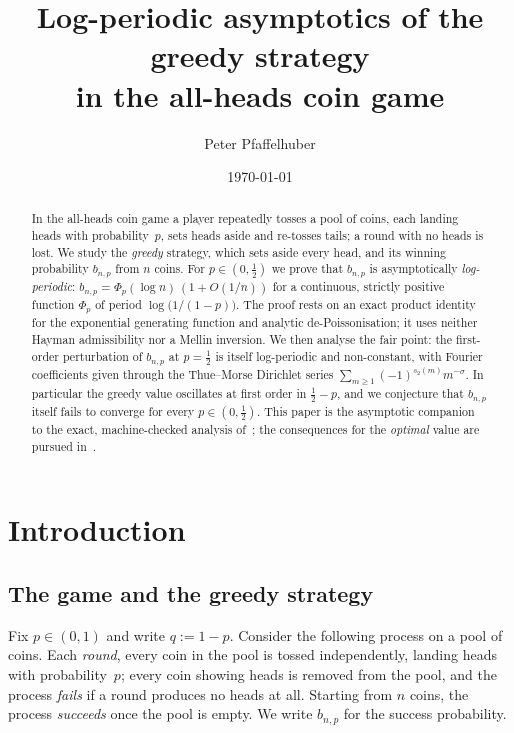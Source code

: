 \documentclass[11pt]{article}
\title{Log-periodic asymptotics of the greedy strategy\\
       in the all-heads coin game}
\author{Peter Pfaffelhuber}
\date{\today}
\theoremstyle{definition}
\begin{document}
\maketitle

\begin{abstract}
  In the all-heads coin game a player repeatedly tosses a pool of
  coins, each landing heads with probability~$p$, sets heads aside and
  re-tosses tails; a round with no heads is lost. We study the
  \emph{greedy} strategy, which sets aside every head, and its winning
  probability $b_{n,p}$ from $n$ coins. For $p\in(0,\tfrac12)$ we prove
  that $b_{n,p}$ is asymptotically \emph{log-periodic}:
  $b_{n,p}=\Phi_p(\log n)\,(1+O(1/n))$ for a continuous, strictly
  positive function $\Phi_p$ of period $\log\bigl(1/(1-p)\bigr)$. The
  proof rests on an exact product identity for the exponential
  generating function and analytic de-Poissonisation; it uses neither
  Hayman admissibility nor a Mellin inversion. We then analyse the fair
  point: the first-order perturbation of $b_{n,p}$ at $p=\tfrac12$ is
  itself log-periodic and non-constant, with Fourier coefficients given
  through the Thue--Morse Dirichlet series
  $\sum_{m\ge1}(-1)^{s_2(m)}m^{-\sigma}$. In particular the greedy
  value oscillates at first order in $\tfrac12-p$, and we conjecture
  that $b_{n,p}$ itself fails to converge for every $p\in(0,\tfrac12)$. This paper is the asymptotic companion
  to the exact, machine-checked analysis of~\cite{Paper1}; the
  consequences for the \emph{optimal} value are pursued
  in~\cite{Paper3}.
\end{abstract}

\section{Introduction}\label{sec:intro}

\subsection{The game and the greedy strategy}

Fix $p\in(0,1)$ and write $q:=1-p$. Consider the following process on a
pool of coins. Each \emph{round}, every coin in the pool is tossed
independently, landing heads with probability~$p$; every coin showing
heads is removed from the pool, and the process \emph{fails} if a round
produces no heads at all. Starting from $n$ coins, the process
\emph{succeeds} once the pool is empty. We write $b_{n,p}$ for the
success probability.
\end{document}
